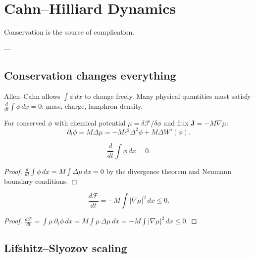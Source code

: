 
\chapter{Cahn--Hilliard Dynamics}
\label{ch:cahn-hilliard}

\epigraph{%
  Conservation is the source of complication.%
}{---}

\section{Conservation changes everything}

Allen--Cahn allows $\int\phi\,dx$ to change freely.
Many physical quantities must satisfy
$\frac{d}{dt}\int\phi\,dx = 0$:
mass, charge, lamphron density.

\begin{definition}
  For conserved $\phi$ with chemical potential
  $\mu = \delta\mathcal{F}/\delta\phi$ and flux
  $\mathbf{J} = -M\nabla\mu$:
  \[
    \boxed{\partial_t\phi
    = M\Delta\mu
    = -M\epsilon^2\Delta^2\phi + M\Delta W'(\phi).}
  \]
\end{definition}

\begin{theorem}
  \label{thm:ch-mass}
  \statusproven{}
  \[
    \frac{d}{dt}\int\phi\,dx = 0.
  \]
\end{theorem}

\begin{proof}
  $\frac{d}{dt}\int\phi\,dx = M\int\Delta\mu\,dx = 0$
  by the divergence theorem and Neumann boundary conditions.
\end{proof}

\begin{theorem}
  \label{thm:ch-dissipation}
  \statusproven{}
  \[
    \frac{d\mathcal{F}}{dt}
    = -M\int|\nabla\mu|^2\,dx \leq 0.
  \]
\end{theorem}

\begin{proof}
  $\frac{d\mathcal{F}}{dt}
  = \int\mu\,\partial_t\phi\,dx
  = M\int\mu\,\Delta\mu\,dx
  = -M\int|\nabla\mu|^2\,dx \leq 0$.
\end{proof}

\section{Lifshitz--Slyozov scaling}

